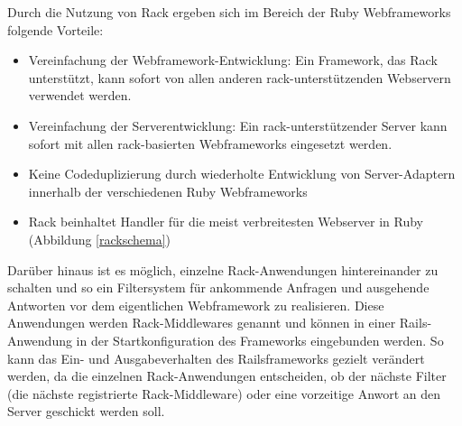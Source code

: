 Durch die Nutzung von Rack ergeben sich im Bereich der Ruby Webframeworks folgende Vorteile:

\begin{itemize}
\item
Vereinfachung der Webframework-Entwicklung: Ein Framework, das Rack unterstützt, kann sofort von allen anderen rack-unterstützenden Webservern verwendet werden.
\item
Vereinfachung der Serverentwicklung: Ein rack-unterstützender Server kann sofort mit allen rack-basierten Webframeworks eingesetzt werden.
\item
Keine Codeduplizierung durch wiederholte Entwicklung von Server-Adaptern innerhalb der verschiedenen Ruby Webframeworks
\item
Rack beinhaltet Handler für die meist verbreitesten Webserver in Ruby (Abbildung \ref{rackschema})
\end{itemize}


Darüber hinaus ist es  möglich, einzelne Rack-Anwendungen hintereinander zu schalten und so ein Filtersystem für ankommende Anfragen und ausgehende Antworten vor dem eigentlichen Webframework zu realisieren.
Diese Anwendungen werden Rack-Middlewares genannt und können in einer Rails-Anwendung in der Startkonfiguration des Frameworks eingebunden werden. So kann das Ein- und Ausgabeverhalten des Railsframeworks gezielt verändert werden, da die einzelnen Rack-Anwendungen entscheiden, ob der nächste Filter (die nächste registrierte Rack-Middleware) oder eine vorzeitige Anwort an den Server geschickt werden soll.

